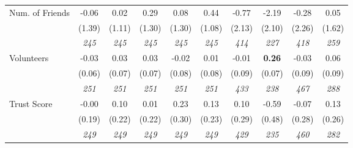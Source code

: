 \begin{tabular}{l c c c c c c c c c}
Num. of Friends & -0.06 & 0.02 & 0.29 & 0.08 & 0.44 & -0.77 & -2.19 & -0.28 & 0.05 \\
& (1.39) & (1.11) & (1.30) & (1.30) & (1.08) & (2.13) & (2.10) & (2.26) & (1.62) \\
& \textit{ 245 } & \textit{ 245 } & \textit{ 245 } & \textit{ 245 } & \textit{ 245 } & \textit{ 414 } & \textit{ 227 } & \textit{ 418 } & \textit{ 259 } \\
Volunteers & -0.03 & 0.03 & 0.03 & -0.02 & 0.01 & -0.01 & \textbf{0.26} & -0.03 & 0.06 \\
& (0.06) & (0.07) & (0.07) & (0.08) & (0.08) & (0.09) & (0.07) & (0.09) & (0.09) \\
& \textit{ 251 } & \textit{ 251 } & \textit{ 251 } & \textit{ 251 } & \textit{ 251 } & \textit{ 433 } & \textit{ 238 } & \textit{ 467 } & \textit{ 288 } \\
Trust Score & -0.00 & 0.10 & 0.01 & 0.23 & 0.13 & 0.10 & -0.59 & -0.07 & 0.13 \\
& (0.19) & (0.22) & (0.22) & (0.30) & (0.23) & (0.29) & (0.48) & (0.28) & (0.26) \\
& \textit{ 249 } & \textit{ 249 } & \textit{ 249 } & \textit{ 249 } & \textit{ 249 } & \textit{ 429 } & \textit{ 235 } & \textit{ 460 } & \textit{ 282 } \\
\bottomrule
\end{tabular}
